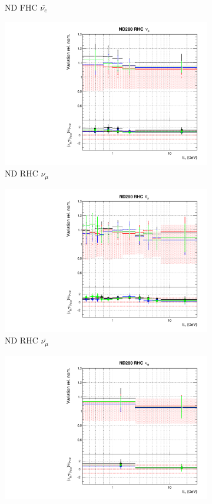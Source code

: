 \begin{figure}[t]
\begin{subfigure}{0.45\textwidth}
  \caption{ND FHC $\bar{\nu_{e}}$}
\end{subfigure}
\begin{subfigure}{0.45\textwidth}
  \centering
  \includegraphics[width=0.75\linewidth]{figs/detcovbinflux_4}
  \caption{ND RHC $\nu_{\mu}$}
\end{subfigure}
\begin{subfigure}{0.45\textwidth}
  \centering
  \includegraphics[width=0.75\linewidth]{figs/detcovbinflux_5}
  \caption{ND RHC $\bar{\nu_{\mu}}$}
\end{subfigure}
\begin{subfigure}{0.45\textwidth}
  \centering
  \includegraphics[width=0.75\linewidth]{figs/detcovbinflux_6}

\end{subfigure}
\end{figure}
